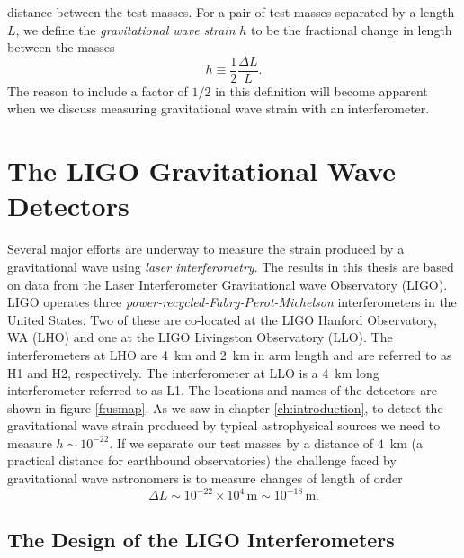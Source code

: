 distance between the test masses. For a pair of test masses separated by a
length $L$, we define the \emph{gravitational wave strain} $h$ to be the
fractional change in length between the masses
\begin{equation}
h \equiv \frac{1}{2} \frac{\Delta L}{L}.
\end{equation}
The reason to include a factor of $1/2$ in this definition will become
apparent when we discuss measuring gravitational wave strain with an
interferometer.  


\section{The LIGO Gravitational Wave Detectors}
\label{s:ifos}

Several major efforts are
underway\cite{Barish:1999,Acernese:2002,Luck:1997hv} to measure the strain
produced by a gravitational wave using \emph{laser interferometry}. The
results in this thesis are based on data from the Laser Interferometer
Gravitational wave Observatory (LIGO). LIGO operates three
\emph{power-recycled-Fabry-Perot-Michelson} interferometers in the United
States. Two of these are co-located at the LIGO Hanford Observatory, WA (LHO)
and one at the LIGO Livingston Observatory (LLO). The interferometers at LHO
are 4~km and 2~km in arm length and are referred to as H1 and H2,
respectively. The interferometer at LLO is a 4~km long interferometer referred
to as L1. The locations and names of the detectors are shown in figure
\ref{f:usmap}.  As we saw in chapter \ref{ch:introduction}, to detect the
gravitational wave strain produced by typical astrophysical sources we need to
measure $h \sim 10^{-22}$. If we separate our test masses by a distance of
$4$~km (a practical distance for earthbound observatories) the challenge
faced by gravitational wave astronomers is to measure changes of length of
order
\begin{equation}
\Delta L \sim 10^{-22} \times 10^4\,\mathrm{m} \sim 10^{-18}\,\mathrm{m}.
\end{equation}

\subsection{The Design of the LIGO Interferometers}
\label{ss:ligoifos}

